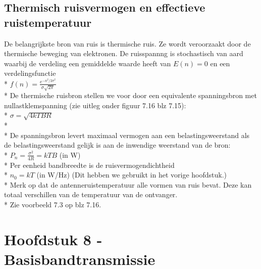 \documentclass[10pt]{article}
\begin{document}
\subsection{Thermisch ruisvermogen en effectieve ruistemperatuur}
De belangrijkste bron van ruis is thermische ruis. Ze wordt veroorzaakt door de thermische beweging van elektronen. De ruisspannng is stochastisch van aard waarbij de verdeling een gemiddelde waarde heeft van $E(n) = 0$ en een verdelingsfunctie\\*
$f(n) = \frac{e^{-n^2/2\sigma^2}}{\sigma \sqrt{2\pi}}$\\*
De thermische ruisbron stellen we voor door een equivalente spanningsbron met nullastklemspanning (zie uitleg onder figuur 7.16 blz 7.15):\\*
$\sigma = \sqrt{4kTBR}$\\*\\*
De spanningsbron levert maximaal vermogen aan een belastingsweerstand als de belastingsweerstand gelijk is aan de inwendige weerstand van de bron:\\*
$P_n = \frac{\sigma^2}{4R} = kTB$ (in W)\\*
Per eenheid bandbreedte is de ruisvermogendichtheid\\*
$n_0 = kT$ (in W/Hz) {\scriptsize (Dit hebben we gebruikt in het vorige hoofdstuk.)}\\*
{\scriptsize Merk op dat de antenneruistemperatuur alle vormen van ruis bevat. Deze kan totaal verschillen van de temperatuur van de ontvanger.\\*
Zie voorbeeld 7.3 op blz 7.16.}
\section{Hoofdstuk 8 - Basisbandtransmissie}
\end{document}
